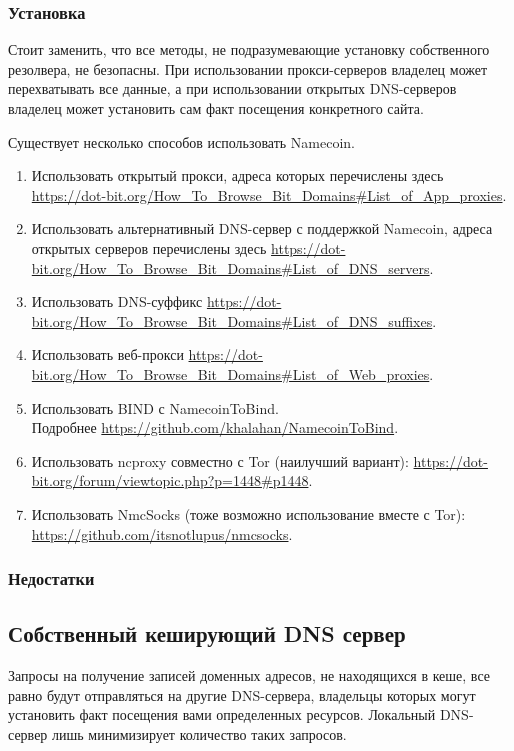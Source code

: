 \subsubsection{Установка}
\begin{important}
Стоит заменить, что все методы, не подразумевающие установку собственного резолвера, не безопасны. При использовании прокси-серверов владелец может перехватывать все данные, а при использовании открытых DNS-серверов владелец может установить сам факт посещения конкретного сайта.
\end{important}
Существует несколько способов использовать Namecoin.
\begin{enumerate}
\item Использовать открытый прокси, адреса которых перечислены здесь \url{https://dot-bit.org/How_To_Browse_Bit_Domains#List_of_App_proxies}.
\item Использовать альтернативный DNS-сервер с поддержкой Namecoin, адреса открытых серверов перечислены здесь \url{https://dot-bit.org/How_To_Browse_Bit_Domains#List_of_DNS_servers}.
\item Использовать DNS-суффикс \url{https://dot-bit.org/How_To_Browse_Bit_Domains#List_of_DNS_suffixes}.
\item Использовать веб-прокси \url{https://dot-bit.org/How_To_Browse_Bit_Domains#List_of_Web_proxies}.
\item Использовать BIND с NamecoinToBind.\\Подробнее \url{https://github.com/khalahan/NamecoinToBind}.
\item Использовать ncproxy совместно с Tor (наилучший вариант): \url{https://dot-bit.org/forum/viewtopic.php?p=1448#p1448}.
\item Использовать NmcSocks (тоже возможно использование вместе с Tor): \url{https://github.com/itsnotlupus/nmcsocks}.
\end{enumerate}
\subsubsection{Недостатки}
\subsection{Собственный кеширующий DNS сервер}
\begin{important}
Запросы на получение записей доменных адресов, не находящихся в кеше, все равно будут отправляться на другие DNS-сервера, владельцы которых могут установить факт посещения вами определенных ресурсов. Локальный DNS-сервер лишь минимизирует количество таких запросов.
\end{important}
